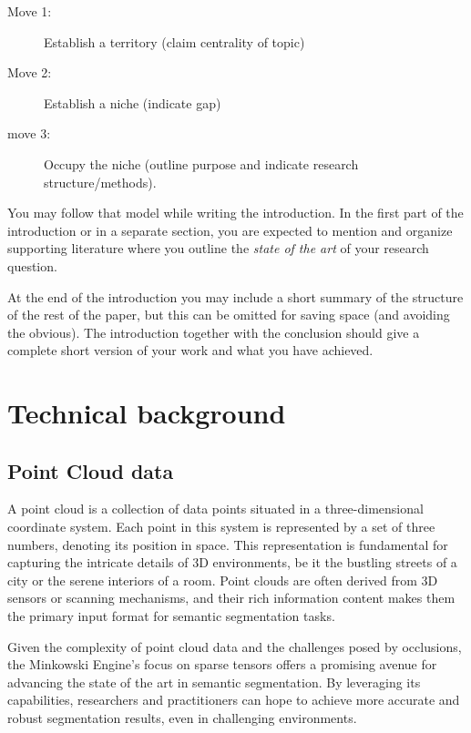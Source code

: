 \documentclass[11pt, a4paper,oneside,chapterprefix=false]{scrbook}
\begin{document}
\begin{description}
\item[Move 1:] Establish a territory (claim centrality of topic)
\item[Move 2:] Establish a niche (indicate gap)
\item[move 3:] Occupy the niche (outline purpose and indicate research structure/methods).
\end{description}

You may follow that model while writing the introduction. In the first part of the introduction or in a separate section, you are expected to mention and organize supporting literature where you outline the \emph{state of the art} of your research question.

At the end of the introduction you may include a short summary of the structure of the rest of the paper, but this can be omitted for saving space (and avoiding the obvious). The introduction together with the conclusion should give a complete short version of your work and what you have achieved.

\section{Technical background}
\subsection{Point Cloud data}

A point cloud is a collection of data points situated in a three-dimensional coordinate system. Each point in this system is represented by a set of three numbers, denoting its position in space. This representation is fundamental for capturing the intricate details of 3D environments, be it the bustling streets of a city or the serene interiors of a room. Point clouds are often derived from 3D sensors or scanning mechanisms, and their rich information content makes them the primary input format for semantic segmentation tasks.

Given the complexity of point cloud data and the challenges posed by occlusions, the Minkowski Engine's focus on sparse tensors offers a promising avenue for advancing the state of the art in semantic segmentation. By leveraging its capabilities, researchers and practitioners can hope to achieve more accurate and robust segmentation results, even in challenging environments.
\end{document}
